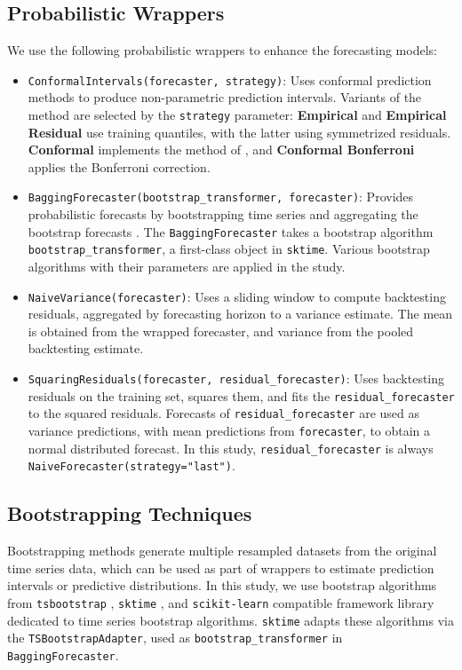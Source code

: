 \subsection{Probabilistic Wrappers}
We use the following probabilistic wrappers to enhance the forecasting models:

\begin{itemize}
    \item \texttt{ConformalIntervals(forecaster, strategy)}: Uses conformal prediction methods \cite{Stankeviciute2021} to produce non-parametric prediction intervals. Variants of the method are selected by the \texttt{strategy} parameter: \textbf{Empirical} and \textbf{Empirical Residual} use training quantiles, with the latter using symmetrized residuals. \textbf{Conformal} implements the method of \cite{Stankeviciute2021}, and \textbf{Conformal Bonferroni} applies the Bonferroni correction.
    \item \texttt{BaggingForecaster(bootstrap\_transformer, forecaster)}: Provides probabilistic forecasts by bootstrapping time series and aggregating the bootstrap forecasts \cite{hyndman2018, bergmeir2016}. The \texttt{BaggingForecaster} takes a bootstrap algorithm \texttt{bootstrap\_transformer}, a first-class object in \texttt{sktime}. Various bootstrap algorithms with their parameters are applied in the study.
    \item \texttt{NaiveVariance(forecaster)}: Uses a sliding window to compute backtesting residuals, aggregated by forecasting horizon to a variance estimate. The mean is obtained from the wrapped forecaster, and variance from the pooled backtesting estimate.
    \item \texttt{SquaringResiduals(forecaster, residual\_forecaster)}: Uses backtesting residuals on the training set, squares them, and fits the \texttt{residual\_forecaster} to the squared residuals. Forecasts of \texttt{residual\_forecaster} are used as variance predictions, with mean predictions from \texttt{forecaster}, to obtain a normal distributed forecast. In this study, \texttt{residual\_forecaster} is always \texttt{NaiveForecaster(strategy="last")}.
\end{itemize}

\subsection{Bootstrapping Techniques}
Bootstrapping methods generate multiple resampled datasets from the original time series data, which can be used as part of wrappers to estimate prediction intervals or predictive distributions. In this study, we use bootstrap algorithms from \texttt{tsbootstrap} \cite{gilda2024tsbootstrap, gilda_2024_10866090_tsbootstrap}, \texttt{sktime} \cite{franz_kiraly_2024_11095261_sktime}, and \texttt{scikit-learn} \cite{pedregosa2011scikit} compatible framework library dedicated to time series bootstrap algorithms. \texttt{sktime} adapts these algorithms via the \texttt{TSBootstrapAdapter}, used as \texttt{bootstrap\_transformer} in \texttt{BaggingForecaster}.

